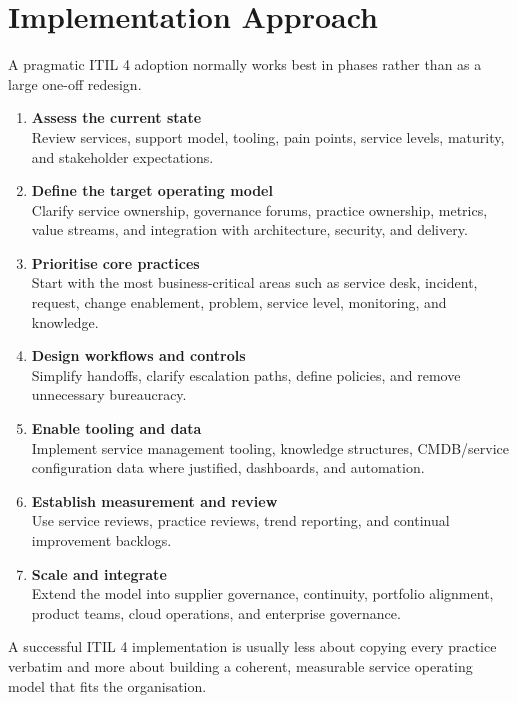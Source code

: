 \documentclass[
  letterpaper,
  DIV=11,
  numbers=noendperiod]{scrartcl}
\begin{document}
\section{Implementation Approach}\label{implementation-approach}

A pragmatic ITIL 4 adoption normally works best in phases rather than as
a large one-off redesign.

\begin{enumerate}
\def\labelenumi{\arabic{enumi}.}
\item
  \textbf{Assess the current state}\\
  Review services, support model, tooling, pain points, service levels,
  maturity, and stakeholder expectations.
\item
  \textbf{Define the target operating model}\\
  Clarify service ownership, governance forums, practice ownership,
  metrics, value streams, and integration with architecture, security,
  and delivery.
\item
  \textbf{Prioritise core practices}\\
  Start with the most business-critical areas such as service desk,
  incident, request, change enablement, problem, service level,
  monitoring, and knowledge.
\item
  \textbf{Design workflows and controls}\\
  Simplify handoffs, clarify escalation paths, define policies, and
  remove unnecessary bureaucracy.
\item
  \textbf{Enable tooling and data}\\
  Implement service management tooling, knowledge structures,
  CMDB/service configuration data where justified, dashboards, and
  automation.
\item
  \textbf{Establish measurement and review}\\
  Use service reviews, practice reviews, trend reporting, and continual
  improvement backlogs.
\item
  \textbf{Scale and integrate}\\
  Extend the model into supplier governance, continuity, portfolio
  alignment, product teams, cloud operations, and enterprise governance.
\end{enumerate}

A successful ITIL 4 implementation is usually less about copying every
practice verbatim and more about building a coherent, measurable service
operating model that fits the organisation.
\end{document}
